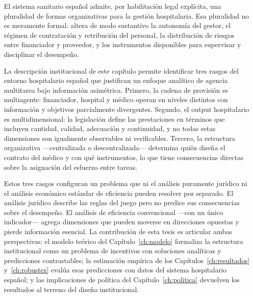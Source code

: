 El sistema sanitario español admite, por habilitación legal explícita, una pluralidad de formas organizativas para la gestión hospitalaria. Esa pluralidad no es meramente formal: altera de modo sustantivo la autonomía del gestor, el régimen de contratación y retribución del personal, la distribución de riesgos entre financiador y proveedor, y los instrumentos disponibles para supervisar y disciplinar el desempeño.

La descripción institucional de este capítulo permite identificar tres rasgos del entorno hospitalario español que justifican un enfoque analítico de agencia multitarea bajo información asimétrica. Primero, la cadena de provisión es multiagente: financiador, hospital y médico operan en niveles distintos con información y objetivos parcialmente divergentes. Segundo, el output hospitalario es multidimensional: la legislación define las prestaciones en términos que incluyen cantidad, calidad, adecuación y continuidad, y no todas estas dimensiones son igualmente observables ni verificables. Tercero, la estructura organizativa ---centralizada o descentralizada--- determina quién diseña el contrato del médico y con qué instrumentos, lo que tiene consecuencias directas sobre la asignación del esfuerzo entre tareas.

Estos tres rasgos configuran un problema que ni el análisis puramente jurídico ni el análisis económico estándar de eficiencia pueden resolver por separado. El análisis jurídico describe las reglas del juego pero no predice sus consecuencias sobre el desempeño. El análisis de eficiencia convencional ---con un único indicador--- agrega dimensiones que pueden moverse en direcciones opuestas y pierde información esencial. La contribución de esta tesis es articular ambas perspectivas: el modelo teórico del Capítulo~\ref{ch:modelo} formaliza la estructura institucional como un problema de incentivos con soluciones analíticas y predicciones contrastables; la estimación empírica de los Capítulos~\ref{ch:resultados} y~\ref{ch:robustez} evalúa esas predicciones con datos del sistema hospitalario español; y las implicaciones de política del Capítulo~\ref{ch:politica} devuelven los resultados al terreno del diseño institucional.
